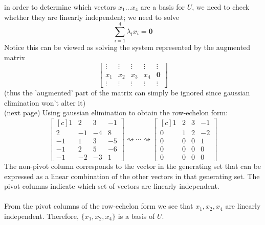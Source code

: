 \documentclass{report}
\begin{document}
in order to determine which vectors $x_1\ldots x_4$ are a basis for $U$, we need to check
whether they are linearly independent; we need to solve
\begin{equation*}
\sum^4_{i=1}\lambda_ix_i=\mathbf{0}
\end{equation*}
Notice this can be viewed as solving the system represented by the augmented matrix
\begin{equation*}
\left[\begin{array}{cccc|c}
\vdots&\vdots&\vdots&\vdots&\vdots\\
x_1&x_2&x_3&x_4&\mathbf{0}\\
\vdots&\vdots&\vdots&\vdots&\vdots
\end{array}\right]
\end{equation*}
(thus the 'augmented' part of the matrix can simply be ignored since gaussian elimination won't alter it)\\
(next page)
\newpage
\noindent Using gaussian elimination to obtain the row-echelon form:
\begin{equation*}
\begin{bmatrix*}[c]
1&2&3&-1\\
2&-1&-4&8\\
-1&1&3&-5\\
-1&2&5&-6\\
-1&-2&-3&1
\end{bmatrix*}\rightsquigarrow\cdots\rightsquigarrow
\begin{bmatrix*}[c]
1&2&3&-1\\
0&1&2&-2\\
0&0&0&1\\
0&0&0&0\\
0&0&0&0
\end{bmatrix*}
\end{equation*}
The non-pivot column corresponds to the vector in the generating set that can be expressed
as a linear combination of the other vectors in that generating set. 
The pivot columns indicate which set of vectors are linearly independent.\\
\vspace{1mm}\\
From the pivot columns of the row-echelon form we see that $x_1,x_2,x_4$ are linearly independent. 
Therefore, $\{x_1,x_2,x_4\}$ is a basis of $U$.
\newpage
\end{document}

